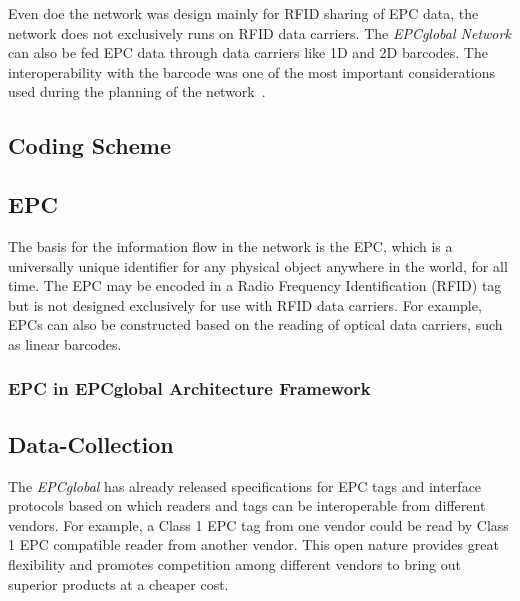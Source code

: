 Even doe the network was design mainly for \gls{RFID} sharing of \gls{EPC} data, the network does not exclusively runs on \gls{RFID} data carriers. The \emph{EPCglobal Network} can also be fed \gls{EPC} data through data carriers like 1D and 2D barcodes. The interoperability with the barcode was one of the most important considerations used during the planning of the network~\cite{RFIDBarcodeInteroperability}.


\subsection{Coding Scheme}


\subsection{EPC}

The basis for the information flow in the network is the \gls{EPC}, which is a universally unique identifier for any physical object anywhere in the world, for all time. 
The EPC may be encoded in a Radio Frequency Identification (RFID) tag but is not designed exclusively for use with RFID data carriers. For example, EPCs can also be constructed based on the reading of optical data carriers, such as linear barcodes. 



\subsubsection{EPC in EPCglobal Architecture Framework}



\subsection{Data-Collection}

The \emph{EPCglobal} has already released specifications for EPC tags and interface protocols based on which readers and tags can be interoperable from different vendors. For example, a Class 1 EPC tag from one vendor could be read by Class 1 EPC compatible reader from another vendor. This open nature provides great flexibility and promotes competition among different vendors to bring out superior products at a cheaper cost.  

